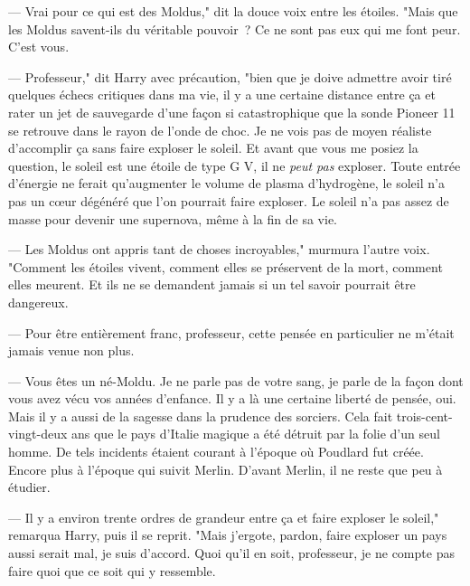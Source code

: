 --- Vrai pour ce qui est des Moldus," dit la douce voix entre les étoiles. "Mais que les Moldus savent-ils du véritable pouvoir~? Ce ne sont pas eux qui me font peur. C'est vous.

--- Professeur," dit Harry avec précaution, "bien que je doive admettre avoir tiré quelques échecs critiques dans ma vie, il y a une certaine distance entre ça et rater un jet de sauvegarde d'une façon si catastrophique que la sonde Pioneer 11 se retrouve dans le rayon de l'onde de choc. Je ne vois pas de moyen réaliste d'accomplir ça sans faire exploser le soleil. Et avant que vous me posiez la question, le soleil est une étoile de type G V, il ne \emph{peut pas} exploser. Toute entrée d'énergie ne ferait qu'augmenter le volume de plasma d'hydrogène, le soleil n'a pas un cœur dégénéré que l'on pourrait faire exploser. Le soleil n'a pas assez de masse pour devenir une supernova, même à la fin de sa vie.

--- Les Moldus ont appris tant de choses incroyables," murmura l'autre voix. "Comment les étoiles vivent, comment elles se préservent de la mort, comment elles meurent. Et ils ne se demandent jamais si un tel savoir pourrait être dangereux.

--- Pour être entièrement franc, professeur, cette pensée en particulier ne m'était jamais venue non plus.

--- Vous êtes un né-Moldu. Je ne parle pas de votre sang, je parle de la façon dont vous avez vécu vos années d'enfance. Il y a là une certaine liberté de pensée, oui. Mais il y a aussi de la sagesse dans la prudence des sorciers. Cela fait trois-cent-vingt-deux ans que le pays d'Italie magique a été détruit par la folie d'un seul homme. De tels incidents étaient courant à l'époque où Poudlard fut créée. Encore plus à l'époque qui suivit Merlin. D'avant Merlin, il ne reste que peu à étudier.

--- Il y a environ trente ordres de grandeur entre ça et faire exploser le soleil," remarqua Harry, puis il se reprit. "Mais j'ergote, pardon, faire exploser un pays aussi serait mal, je suis d'accord. Quoi qu'il en soit, professeur, je ne compte pas faire quoi que ce soit qui y ressemble.

